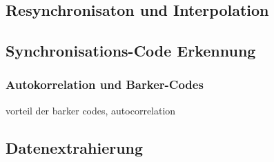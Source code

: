 \subsection{Resynchronisaton und Interpolation}

\subsection{Synchronisations-Code Erkennung}

\subsubsection{Autokorrelation und Barker-Codes} 
\label{sec:barkercode}


vorteil der barker codes, autocorrelation

\subsection{Datenextrahierung}



